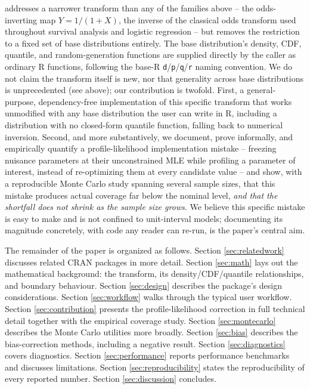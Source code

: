  addresses a narrower transform than any of the
families above -- the odds-inverting map $Y = 1/(1+X)$, the inverse of
the classical odds transform used throughout survival analysis and
logistic regression -- but removes the restriction to a fixed set of
base distributions entirely. The base distribution's density, CDF,
quantile, and random-generation functions are supplied directly by the
caller as ordinary R functions, following the base-R \texttt{d}/\texttt{p}/\texttt{q}/\texttt{r}
naming convention. We do not claim the transform itself is new, nor
that generality across base distributions is unprecedented (see
 above); our contribution is twofold. First, a
general-purpose, dependency-free implementation of this specific
transform that works unmodified with any base distribution the user
can write in R, including a distribution with no closed-form quantile
function, falling back to numerical inversion. Second, and more
substantively, we document, prove informally, and empirically quantify
a profile-likelihood implementation mistake -- freezing nuisance
parameters at their unconstrained MLE while profiling a parameter of
interest, instead of re-optimizing them at every candidate value -- and
show, with a reproducible Monte Carlo study spanning several sample
sizes, that this mistake produces actual coverage far below the
nominal level, \emph{and that the shortfall does not shrink as the
sample size grows}. We believe this specific mistake is easy to make
and is not confined to unit-interval models; documenting its magnitude
concretely, with code any reader can re-run, is the paper's central
aim.

The remainder of the paper is organized as follows. Section
\ref{sec:relatedwork} discusses related CRAN packages in more detail.
Section \ref{sec:math} lays out the mathematical background: the
transform, its density/CDF/quantile relationships, and boundary
behaviour. Section \ref{sec:design} describes the package's design
considerations. Section \ref{sec:workflow} walks through the typical
user workflow. Section \ref{sec:contribution} presents the
profile-likelihood correction in full technical detail together with
the empirical coverage study. Section \ref{sec:montecarlo} describes
the Monte Carlo utilities more broadly. Section \ref{sec:bias}
describes the bias-correction methods, including a negative result.
Section \ref{sec:diagnostics} covers diagnostics. Section
\ref{sec:performance} reports performance benchmarks and discusses
limitations. Section \ref{sec:reproducibility} states the
reproducibility of every reported number. Section \ref{sec:discussion}
concludes.

